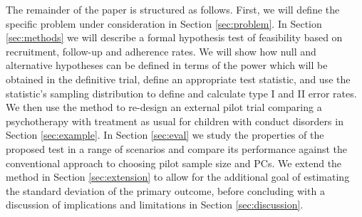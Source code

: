\documentclass{article}
\begin{document}


The remainder of the paper is structured as follows. First, we will define the specific problem under consideration in Section \ref{sec:problem}. In Section \ref{sec:methods} we will describe a formal hypothesis test of feasibility based on recruitment, follow-up and adherence rates. We will show how null and alternative hypotheses can be defined in terms of the power which will be obtained in the definitive trial, define an appropriate test statistic, and use the statistic's sampling distribution to define and calculate type I and II error rates. We then use the method to re-design an external pilot trial comparing a psychotherapy with treatment as usual for children with conduct disorders in Section \ref{sec:example}. In Section \ref{sec:eval} we study the properties of the proposed test in a range of scenarios and compare its performance against the conventional approach to choosing pilot sample size and PCs. We extend the method in Section \ref{sec:extension} to allow for the additional goal of estimating the standard deviation of the primary outcome, before concluding with a discussion of implications and limitations in Section \ref{sec:discussion}.

\end{document}
